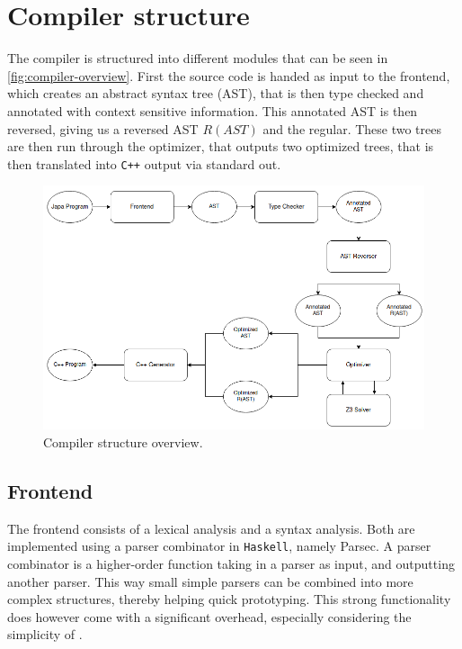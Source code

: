 \section{Compiler structure}
The \lan compiler is structured into different modules that can be seen in
\autoref{fig:compiler-overview}. First the \lan source code is handed as input to the frontend,
which creates an abstract syntax tree (AST), that is then type checked and annotated with
context sensitive information. This annotated AST is then reversed, giving us a reversed AST
$R(AST)$ and the regular. These two trees are then run through the optimizer, that outputs
two optimized trees, that is then translated into \texttt{C++} output via standard out.

\begin{figure}[h!]
    \centering
    \includegraphics[scale=0.55]{imgs/compiler-overview.png}
    \caption{Compiler structure overview.}
    \label{fig:compiler-overview}
\end{figure}

\subsection{Frontend}
The frontend consists of a lexical analysis and a syntax analysis. Both are implemented using a
parser combinator in \texttt{Haskell}, namely Parsec. A parser combinator is a higher-order
function taking in a parser as input, and outputting another parser. This way small simple parsers
can be combined into more complex structures, thereby helping quick prototyping. This strong
functionality does however come with a significant overhead, especially considering the simplicity
of \lan \cite{parser}.


